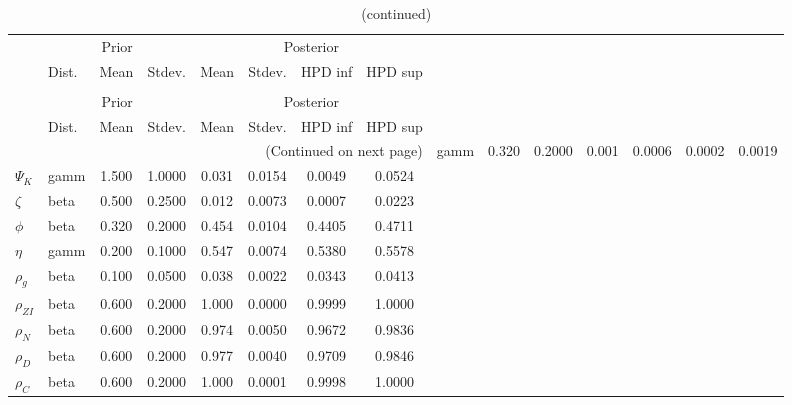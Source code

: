  
\begin{center}
\begin{longtable}{llcccccc} 
\caption{Results from Metropolis-Hastings (parameters)}
 \label{Table:MHPosterior:1}\\
\toprule 
  & \multicolumn{3}{c}{Prior}  &  \multicolumn{4}{c}{Posterior} \\
  \cmidrule(r{.75em}){2-4} \cmidrule(r{.75em}){5-8}
  & Dist. & Mean  & Stdev. & Mean & Stdev. & HPD inf & HPD sup\\
\midrule \endfirsthead 
\caption{(continued)}\\\toprule 
  & \multicolumn{3}{c}{Prior}  &  \multicolumn{4}{c}{Posterior} \\
  \cmidrule(r{.75em}){2-4} \cmidrule(r{.75em}){5-8}
  & Dist. & Mean  & Stdev. & Mean & Stdev. & HPD inf & HPD sup\\
\midrule \endhead 
\bottomrule \multicolumn{8}{r}{(Continued on next page)} \endfoot 
\bottomrule \endlastfoot 
${\sigma_a}$ & gamm &   0.320 & 0.2000 &   0.001& 0.0006 &  0.0002 &  0.0019 \\ 
${\Psi_K}$ & gamm &   1.500 & 1.0000 &   0.031& 0.0154 &  0.0049 &  0.0524 \\ 
${\zeta}$ & beta &   0.500 & 0.2500 &   0.012& 0.0073 &  0.0007 &  0.0223 \\ 
${\phi}$ & beta &   0.320 & 0.2000 &   0.454& 0.0104 &  0.4405 &  0.4711 \\ 
${\eta}$ & gamm &   0.200 & 0.1000 &   0.547& 0.0074 &  0.5380 &  0.5578 \\ 
${\rho_g}$ & beta &   0.100 & 0.0500 &   0.038& 0.0022 &  0.0343 &  0.0413 \\ 
${\rho_{ZI}}$ & beta &   0.600 & 0.2000 &   1.000& 0.0000 &  0.9999 &  1.0000 \\ 
${\rho_N}$ & beta &   0.600 & 0.2000 &   0.974& 0.0050 &  0.9672 &  0.9836 \\ 
${\rho_D}$ & beta &   0.600 & 0.2000 &   0.977& 0.0040 &  0.9709 &  0.9846 \\ 
${\rho_C}$ & beta &   0.600 & 0.2000 &   1.000& 0.0001 &  0.9998 &  1.0000 \\ 
\end{longtable}
 \end{center}
